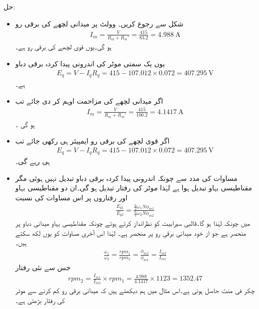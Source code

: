 حل:
\begin{itemize}
\item
شکل   سے رجوع کریں۔ وولٹ پر میدانی لچھے کی برقی رو
\begin{align*}
I_m=\tfrac{V}{R_m+R_m'}=\frac{415}{83.2}=\SI{4.988}{\ampere}
\end{align*}
ہو گی۔یوں قوی لچھے کی برقی رو  ہے۔
\item
یوں یک سمتی موٹر کی اندرونی پیدا کردہ برقی دباو
\begin{align*}
E_q=V-I_q R_q=415-107.012\times 0.072=\SI{407.295}{\volt}
\end{align*}
ہے۔
\item
اگر میدانی لچھے کی مزاحمت  اوہم کر دی جائے  تب
\begin{align*}
I_m=\frac{V}{R_m+R_m'}=\frac{415}{100.2}=\SI{4.1417}{\ampere}
\end{align*}
ہو گی ۔
\item
اگر قوی لچھے کی برقی رو  ایمپیئر ہی رکھی جائے تب 
\begin{align*}
E_q=V-I_q R_q=415-107.012 \times 0.072=\SI{407.295}{\volt}
\end{align*}
ہی رہے گی۔
\item
مساوات   کی مدد سے  چونکہ اندرونی پیدا کردہ برقی دباو تبدیل نہیں ہوئی مگر مقناطیسی بہاو تبدیل ہوا ہے لہٰذا موٹر کی رفتار تبدیل ہو گی۔ان دو مقناطیسی بہاو اور رفتاروں پر اس مساوات کی نسبت
\begin{align*}
\frac{E_{q1}}{E_{q2}}=\frac{\frac{n}{2} \omega_1 N \phi_{m1}}{\frac{n}{2} \omega_2 N \phi_{m2}}
\end{align*}
میں چونکہ  لہٰذا  ہو گا۔قالبی سیرابیت کو نظرانداز کرتے ہوئے چونکہ مقناطیسی بہاو میدانی دباو پر منحصر ہے جو از خود میدانی برقی رو پر منحصر ہے۔ لہٰذا اس آخری مساوات کو یوں لکھ سکتے ہیں۔
\begin{align*}
\frac{\omega_1}{\omega_2}=\frac{rpm_1}{rpm_2}=\frac{\phi_{m2}}{\phi_{m1}}=\frac{I_{m2}}{I_{m1}}
\end{align*}
جس سے نئی رفتار
\begin{align*}
rpm_2=\frac{I_{m1}}{I_{m2}} \times rpm_1=\frac{4.988}{4.1417} \times 1123=1352.47
\end{align*}
چکر فی منٹ حاصل ہوتی ہے۔اس مثال میں ہم دیکھتے ہیں کہ میدانی برقی رو کم کرنے سے موٹر کی رفتار بڑھتی ہے۔
\end{itemize}
%
